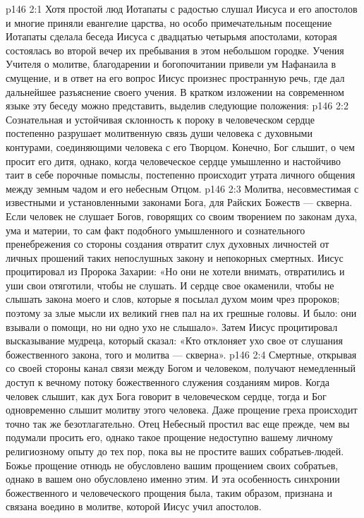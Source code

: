 \vs p146 2:1 Хотя простой люд Иотапаты с радостью слушал Иисуса и его апостолов и многие приняли евангелие царства, но особо примечательным посещение Иотапаты сделала беседа Иисуса с двадцатью четырьмя апостолами, которая состоялась во второй вечер их пребывания в этом небольшом городке. Учения Учителя о молитве, благодарении и богопочитании привели ум Нафанаила в смущение, и в ответ на его вопрос Иисус произнес пространную речь, где дал дальнейшее разъяснение своего учения. В кратком изложении на современном языке эту беседу можно представить, выделив следующие положения:
\vs p146 2:2 \pc {}\bibnobreakspace Сознательная и устойчивая склонность к пороку в человеческом сердце постепенно разрушает молитвенную связь души человека с духовными контурами, соединяющими человека с его Творцом. Конечно, Бог слышит, о чем просит его дитя, однако, когда человеческое сердце умышленно и настойчиво таит в себе порочные помыслы, постепенно происходит утрата личного общения между земным чадом и его небесным Отцом.
\vs p146 2:3 \pc {}\bibnobreakspace Молитва, несовместимая с известными и установленными законами Бога, для Райских Божеств --- скверна. Если человек не слушает Богов, говорящих со своим творением по законам духа, ума и материи, то сам факт подобного умышленного и сознательного пренебрежения со стороны создания отвратит слух духовных личностей от личных прошений таких непослушных закону и непокорных смертных. Иисус процитировал из Пророка Захарии: «Но они не хотели внимать, отвратились и уши свои отяготили, чтобы не слушать. И сердце свое окаменили, чтобы не слышать закона моего и слов, которые я посылал духом моим чрез пророков; поэтому за злые мысли их великий гнев пал на их грешные головы. И было: они взывали о помощи, но ни одно ухо не слышало». Затем Иисус процитировал высказывание мудреца, который сказал: «Кто отклоняет ухо свое от слушания божественного закона, того и молитва --- скверна».
\vs p146 2:4 \pc {}\bibnobreakspace Смертные, открывая со своей стороны канал связи между Богом и человеком, получают немедленный доступ к вечному потоку божественного служения созданиям миров. Когда человек слышит, как дух Бога говорит в человеческом сердце, тогда и Бог одновременно слышит молитву этого человека. Даже прощение греха происходит точно так же безотлагательно. Отец Небесный простил вас еще прежде, чем вы подумали просить его, однако такое прощение недоступно вашему личному религиозному опыту до тех пор, пока вы не простите ваших собратьев\hyp{}людей.  Божье прощение отнюдь не обусловлено вашим прощением своих собратьев, однако в вашем  оно обусловлено именно этим. И эта особенность синхронии божественного и человеческого прощения была, таким образом, признана и связана воедино в молитве, которой Иисус учил апостолов.
